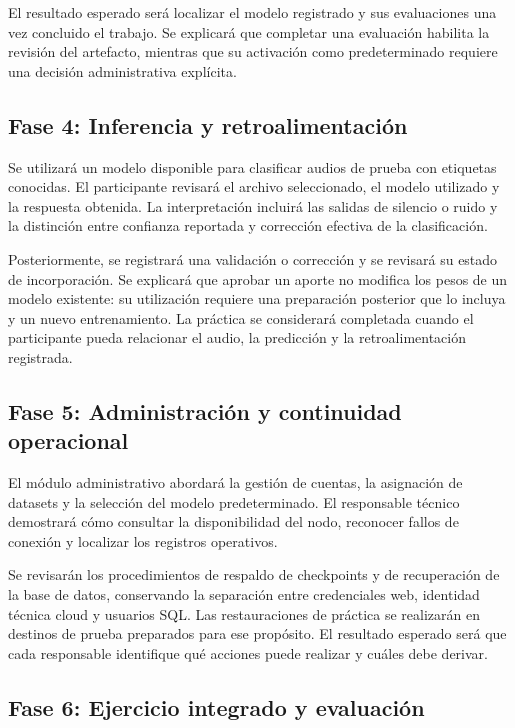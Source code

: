 El resultado esperado será localizar el modelo registrado y sus evaluaciones
una vez concluido el trabajo. Se explicará que completar una evaluación
habilita la revisión del artefacto, mientras que su activación como
predeterminado requiere una decisión administrativa explícita.

\subsection{Fase 4: Inferencia y retroalimentación}

Se utilizará un modelo disponible para clasificar audios de prueba con
etiquetas conocidas. El participante revisará el archivo seleccionado, el
modelo utilizado y la respuesta obtenida. La interpretación incluirá las
salidas de silencio o ruido y la distinción entre confianza reportada y
corrección efectiva de la clasificación.

Posteriormente, se registrará una validación o corrección y se revisará su
estado de incorporación. Se explicará que aprobar un aporte no modifica los
pesos de un modelo existente: su utilización requiere una preparación posterior
que lo incluya y un nuevo entrenamiento. La práctica se considerará completada
cuando el participante pueda relacionar el audio, la predicción y la
retroalimentación registrada.

\subsection{Fase 5: Administración y continuidad operacional}

El módulo administrativo abordará la gestión de cuentas, la asignación de
datasets y la selección del modelo predeterminado. El responsable técnico
demostrará cómo consultar la disponibilidad del nodo, reconocer fallos de
conexión y localizar los registros operativos.

Se revisarán los procedimientos de respaldo de checkpoints y de recuperación
de la base de datos, conservando la separación entre credenciales web,
identidad técnica cloud y usuarios SQL. Las restauraciones de práctica se
realizarán en destinos de prueba preparados para ese propósito. El resultado
esperado será que cada responsable identifique qué acciones puede realizar y
cuáles debe derivar.

\subsection{Fase 6: Ejercicio integrado y evaluación}

